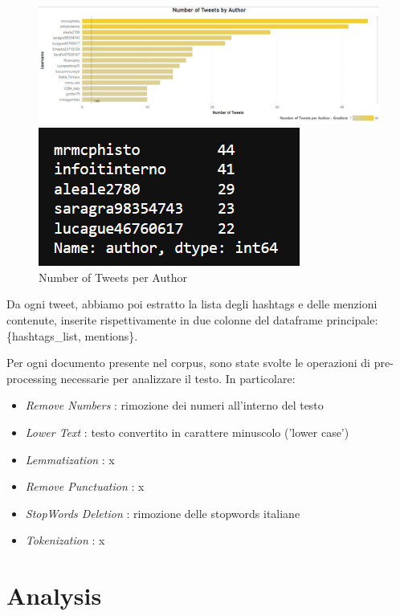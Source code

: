 \documentclass[12pt,journal,compsoc]{IEEEtran}
\begin{document}
\begin{figure}[H]
  \includegraphics[scale=0.4]{./images/tweetsxauthor.png}
  \begin{center}
  \includegraphics[scale=1]{./images/freq-authors.png}
  \end{center}
  \caption{Number of Tweets per Author}
\end{figure}

Da ogni tweet, abbiamo poi estratto la lista degli hashtags e delle menzioni contenute, inserite rispettivamente in due colonne del dataframe principale: \{hashtags\_list, mentions\}.

Per ogni documento presente nel corpus, sono state svolte le operazioni di pre-processing necessarie per analizzare il testo. In particolare:

\begin{itemize}
	\item \textit{Remove Numbers} : rimozione dei numeri all'interno del testo
	\item \textit{Lower Text} : testo convertito in carattere minuscolo ('lower case')
	\item \textit{Lemmatization} : x
	\item \textit{Remove Punctuation} : x
	\item \textit{StopWords Deletion} : rimozione delle stopwords italiane
	\item \textit{Tokenization} : x
\end{itemize}

\section{Analysis}
\end{document}
